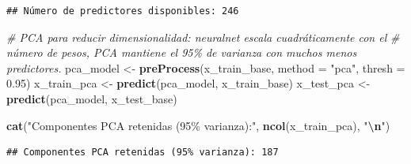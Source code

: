 \documentclass[
]{article}
\newenvironment{Shaded}{\begin{snugshade}}{\end{snugshade}}
\newcommand{\AttributeTok}[1]{\textcolor[rgb]{0.13,0.29,0.53}{#1}}
\newcommand{\CommentTok}[1]{\textcolor[rgb]{0.56,0.35,0.01}{\textit{#1}}}
\newcommand{\FloatTok}[1]{\textcolor[rgb]{0.00,0.00,0.81}{#1}}
\newcommand{\FunctionTok}[1]{\textcolor[rgb]{0.13,0.29,0.53}{\textbf{#1}}}
\newcommand{\NormalTok}[1]{#1}
\newcommand{\OtherTok}[1]{\textcolor[rgb]{0.56,0.35,0.01}{#1}}
\newcommand{\SpecialCharTok}[1]{\textcolor[rgb]{0.81,0.36,0.00}{\textbf{#1}}}
\newcommand{\StringTok}[1]{\textcolor[rgb]{0.31,0.60,0.02}{#1}}
\begin{document}
\begin{verbatim}
## Número de predictores disponibles: 246
\end{verbatim}

\begin{Shaded}
\begin{Highlighting}[]
\CommentTok{\# PCA para reducir dimensionalidad: neuralnet escala cuadráticamente con el}
\CommentTok{\# número de pesos, PCA mantiene el 95\% de varianza con muchos menos predictores.}
\NormalTok{pca\_model   }\OtherTok{\textless{}{-}} \FunctionTok{preProcess}\NormalTok{(x\_train\_base, }\AttributeTok{method =} \StringTok{"pca"}\NormalTok{, }\AttributeTok{thresh =} \FloatTok{0.95}\NormalTok{)}
\NormalTok{x\_train\_pca }\OtherTok{\textless{}{-}} \FunctionTok{predict}\NormalTok{(pca\_model, x\_train\_base)}
\NormalTok{x\_test\_pca  }\OtherTok{\textless{}{-}} \FunctionTok{predict}\NormalTok{(pca\_model, x\_test\_base)}

\FunctionTok{cat}\NormalTok{(}\StringTok{"Componentes PCA retenidas (95\% varianza):"}\NormalTok{, }\FunctionTok{ncol}\NormalTok{(x\_train\_pca), }\StringTok{"}\SpecialCharTok{\textbackslash{}n}\StringTok{"}\NormalTok{)}
\end{Highlighting}
\end{Shaded}

\begin{verbatim}
## Componentes PCA retenidas (95% varianza): 187
\end{verbatim}
\end{document}
